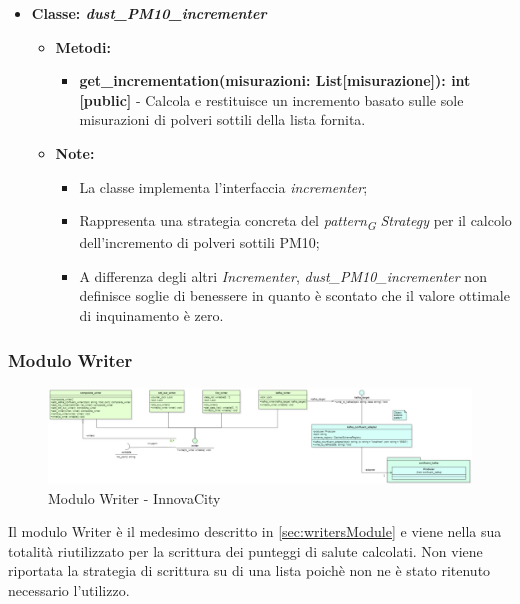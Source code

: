 \begin{itemize}
    \item{\textbf{Classe: \textit{dust\_PM10\_incrementer}}}
    \begin{itemize}
        \item \textbf{Metodi:} 
        \begin{itemize}
            \item \textbf{get\_incrementation(misurazioni: List[misurazione]): int [public]} - Calcola e restituisce un incremento basato sulle sole misurazioni di polveri sottili della lista fornita.
        \end{itemize}
        \item\textbf{Note:}
        \begin{itemize}
            \item La classe implementa l'interfaccia \textit{incrementer};
            \item Rappresenta una strategia concreta del \textit{pattern}\textsubscript{\textit{G}} \textit{Strategy} per il calcolo dell'incremento di polveri sottili PM10;
            \item A differenza degli altri \textit{Incrementer}, \textit{dust\_PM10\_incrementer} non definisce soglie di benessere in quanto è scontato che il valore ottimale di inquinamento è zero.
        \end{itemize}
    \end{itemize}

\end{itemize}

\subsubsection{Modulo Writer}
\begin{figure}[H]
    \centering
    \includegraphics[width=1\textwidth]{../Images/SpecificaTecnica/writerModule.PNG}
    \caption{Modulo Writer - InnovaCity}
    \label{fig: healthModelloWriter}
\end{figure}
Il modulo Writer è il medesimo descritto in \ref{sec:writersModule} e viene nella sua totalità riutilizzato per la scrittura dei punteggi di salute calcolati.
Non viene riportata la strategia di scrittura su di una lista poichè non ne è stato ritenuto necessario l'utilizzo.

